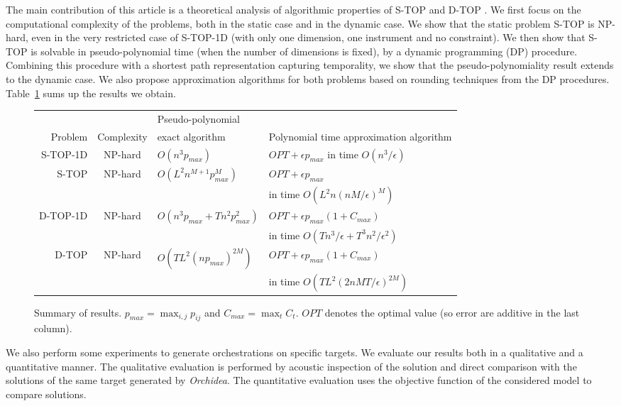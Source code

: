 \documentclass[a4paper]{book}
\newcommand{\stat}{{\sc S-TOP }}
\newcommand{\statoned}{{\sc S-TOP-1D }}
\newcommand{\dyn}{{\sc D-TOP }}
\newcommand{\dynoned}{{\sc D-TOP-1D }}
\begin{document}
The main contribution of this article is a theoretical analysis of algorithmic properties of \stat and \dyn. We first focus on the computational complexity of the problems, both in the static case and in the dynamic case. We show that the static problem \stat is NP-hard, even in the very restricted case of \statoned (with only one dimension, one instrument and no constraint). 
We then show that \stat is solvable in pseudo-polynomial time (when the number of dimensions is fixed), by a dynamic programming (DP) procedure. Combining this procedure with a shortest path representation capturing temporality, we show that the pseudo-polynomiality result extends to the dynamic case. We also propose approximation algorithms for both problems based on rounding techniques from the DP procedures. Table~\ref{table:results} sums up the results we obtain.
\begin{figure}
\begin{tabular}{r||c|l|l}
     &   & Pseudo-polynomial & \\
        Problem  & Complexity  & exact algorithm &  Polynomial time approximation algorithm\\
     \hline \hline
     \statoned &  NP-hard & $O(n^3p_{max})$ & $OPT+\epsilon p_{max}$ in time $O(n^3/\epsilon)$ \\ \hline
          \stat &  NP-hard & $O(L^2n^{M+1}p_{max}^M)$ & $OPT+\epsilon p_{max}$ \\ 
                     &   &  &  in time $O(L^2n(nM/\epsilon)^M)$ \\ \hline
               \dynoned &  NP-hard & $O(n^3p_{max}+Tn^2p_{max}^2)$ & $OPT+\epsilon p_{max}(1+C_{max})$  \\   &  &  &  in time $O(Tn^3/\epsilon+T^3n^2/\epsilon^2)$ \\
               \hline
     \dyn &  NP-hard & $O(TL^2(np_{max})^{2M})$ & $OPT+\epsilon p_{max}(1+C_{max})$ \\ 
           &   &  & in time $O(TL^2(2nMT/\epsilon)^{2M})$ \\ \hline
\end{tabular}
\caption{Summary of results. $p_{max}=\max_{i,j} p_{ij}$ and $C_{max}=\max_{t}C_t$. $OPT$ denotes the optimal value (so error are additive in the last column).}\label{table:results}
\end{figure}

We also perform some experiments to generate orchestrations on specific targets. We evaluate our results both in a qualitative and a quantitative manner. 
The qualitative evaluation is performed by acoustic inspection of the solution and direct comparison with the solutions of the same target generated by \textit{Orchidea}. The quantitative evaluation uses the objective function of the considered model to compare solutions.
\end{document}
